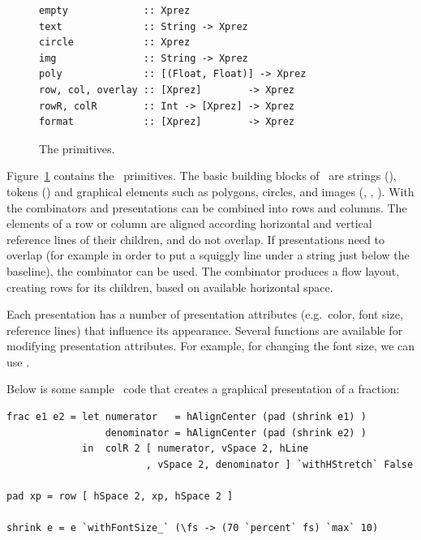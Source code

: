 \documentclass[12pt]{article}
\begin{document}
\begin{figure}
\begin{footnotesize}
\begin{center}
\begin{footnotesize}
\begin{verbatim}
empty             :: Xprez
text              :: String -> Xprez             
circle            :: Xprez                       
img               :: String -> Xprez             
poly              :: [(Float, Float)] -> Xprez 
row, col, overlay :: [Xprez]        -> Xprez          
rowR, colR        :: Int -> [Xprez] -> Xprez   
format            :: [Xprez]        -> Xprez
\end{verbatim}
\end{footnotesize}
\caption{The {\Xprez} primitives.} \label{fig:xprezPrim} 
\end{center}
\end{footnotesize}
\end{figure}

Figure~\ref{fig:xprezPrim} contains the \Xprez\ primitives. The basic building blocks of \Xprez\ are strings (), tokens () and graphical elements such as polygons, circles, and images (, , ). With the combinators  and  presentations can be combined into rows and columns. The elements of a row or column are aligned according horizontal and vertical reference lines of their children, and do not overlap. If presentations need to overlap (for example in order to put a squiggly line under a string just below the baseline), the  combinator can be used. The  combinator produces a flow layout, creating rows for its children, based on available horizontal space.

Each presentation has a number of presentation attributes (e.g.\ color, font size, reference lines) that influence its appearance. Several functions are available for modifying presentation attributes. For example, for changing the font size, we can use . 

Below is some sample \Xprez\ code that creates a graphical presentation of a fraction:

\begin{footnotesize}
\begin{verbatim}
frac e1 e2 = let numerator   = hAlignCenter (pad (shrink e1) )
                 denominator = hAlignCenter (pad (shrink e2) )
             in  colR 2 [ numerator, vSpace 2, hLine
                        , vSpace 2, denominator ] `withHStretch` False
                        
pad xp = row [ hSpace 2, xp, hSpace 2 ]

shrink e = e `withFontSize_` (\fs -> (70 `percent` fs) `max` 10)
\end{verbatim}
\end{footnotesize}
\end{document}
